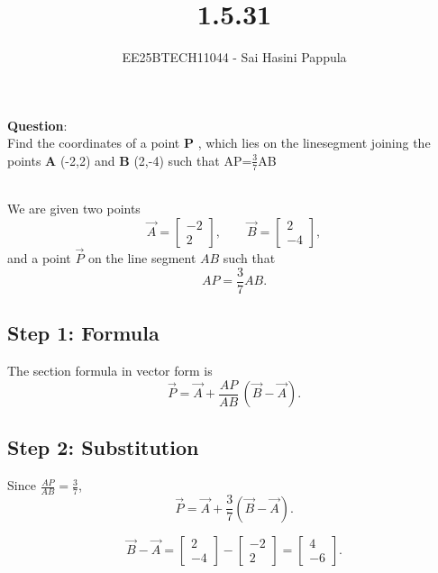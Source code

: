 \documentclass[journal]{IEEEtran}
\begin{document}

\vspace{3cm}

\title{1.5.31}
\author{EE25BTECH11044 - Sai Hasini Pappula}
 \maketitle
{\let\newpage\relax\maketitle}

\renewcommand{\thefigure}{\theenumi}
\renewcommand{\thetable}{\theenumi}
\setlength{\intextsep}{10pt} %


\renewcommand{\thetable}{\theenumi}

\textbf{Question}:\\
Find the coordinates of a point \textbf{P} , which lies on the linesegment joining the points \textbf{A} (-2,2) and \textbf{B}
(2,-4) such that AP=$\frac{3}{7}$AB

\solution\\
We are given two points
\[
\vec{A} = \begin{bmatrix}-2 \\ 2\end{bmatrix},\qquad 
\vec{B} = \begin{bmatrix}2 \\ -4\end{bmatrix},
\]
and a point $\vec{P}$ on the line segment $AB$ such that
\[
AP = \frac{3}{7}AB.
\]

\subsection*{Step 1: Formula}
The section formula in vector form is
\[
\vec{P} = \vec{A} + \frac{AP}{AB}\,(\vec{B}-\vec{A}).
\]

\subsection*{Step 2: Substitution}
Since $\tfrac{AP}{AB}=\tfrac{3}{7}$,
\[
\vec{P} = \vec{A} + \frac{3}{7}(\vec{B}-\vec{A}).
\]

\[
\vec{B}-\vec{A} =
\begin{bmatrix}2 \\ -4\end{bmatrix} -
\begin{bmatrix}-2 \\ 2\end{bmatrix}
=
\begin{bmatrix}4 \\ -6\end{bmatrix}.
\]
\end{document}
